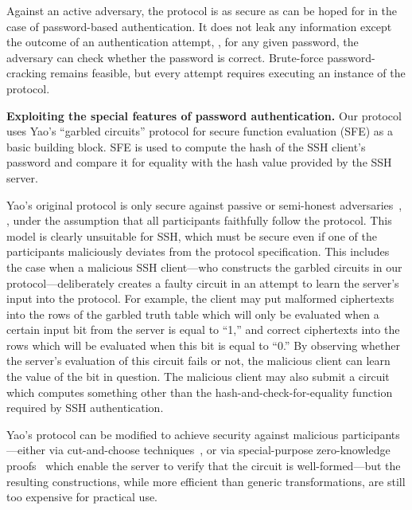 \begin{description}
Against an active adversary, the protocol is as secure as can be hoped
for in the case of password-based authentication.  It does not leak
any information except the outcome of an authentication attempt, \ie,
for any given password, the adversary can check whether the password
is correct.  Brute-force password-cracking remains feasible, but every
attempt requires executing an instance of the protocol.

\end{description}



\vspace{1ex}
\noindent
\textbf{Exploiting the special features of password authentication.}  
Our protocol uses Yao's ``garbled circuits'' protocol for secure function
evaluation (SFE) as a basic building block.  SFE is used to compute the
hash of the SSH client's password and compare it for equality with the
hash value provided by the SSH server.

Yao's original protocol is only secure against passive or semi-honest
adversaries~\cite{lindellpinkas-jcs,Yao86}, \ie, under the assumption
that all participants faithfully follow the protocol.  This model is
clearly unsuitable for SSH, which must be secure even if one of the
participants maliciously deviates from the protocol specification.
This includes the case when a malicious SSH client---who constructs
the garbled circuits in our protocol---deliberately creates a faulty
circuit in an attempt to learn the server's input into the protocol.
For example, the client may put malformed ciphertexts into the rows of
the garbled truth table which will only be evaluated when a certain
input bit from the server is equal to ``1,'' and correct ciphertexts
into the rows which will be evaluated when this bit is equal to ``0.''
By observing whether the server's evaluation of this circuit fails or
not, the malicious client can learn the value of the bit in question.
The malicious client may also submit a circuit which computes something
other than the hash-and-check-for-equality function required by SSH
authentication.

Yao's protocol can be modified to achieve security
against malicious parti\-cipants---either via cut-and-choose
techniques~\cite{lindellpinkas-eurocrypt07,woodruff-eurocrypt07}, or via
special-purpose zero-knowledge proofs~\cite{jareckishmatikov-eurocrypt07}
which enable the server to verify that the circuit is well-formed---but
the resulting constructions, while more efficient than generic
transformations, are still too expensive for practical use.

